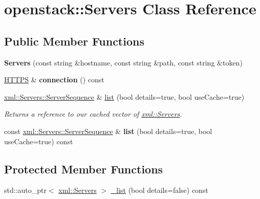 \hypertarget{classopenstack_1_1Servers}{
\section{openstack::Servers Class Reference}
\label{classopenstack_1_1Servers}
}
\subsection*{Public Member Functions}
\begin{DoxyCompactItemize}
\item 
\hypertarget{classopenstack_1_1Servers_aa73baeb7fe19a9fcbb33b9b1c321c0b3}{
{\bfseries Servers} (const string \&hostname, const string \&path, const string \&token)}
\label{classopenstack_1_1Servers_aa73baeb7fe19a9fcbb33b9b1c321c0b3}

\item 
\hypertarget{classopenstack_1_1Servers_ac46388d4916edea6bbe24c6c1189397a}{
\hyperlink{classopenstack_1_1HTTPS}{HTTPS} \& {\bfseries connection} () const }
\label{classopenstack_1_1Servers_ac46388d4916edea6bbe24c6c1189397a}

\item 
\hyperlink{classopenstack_1_1xml_1_1Servers_a9cc28e68df0ebb654db381f4bc6b43e0}{xml::Servers::ServerSequence} \& \hyperlink{classopenstack_1_1Servers_ac7aa9b652744badc3ea60b685404bf6a}{list} (bool details=true, bool useCache=true)
\begin{DoxyCompactList}\small\item\em Returns a reference to our cached vector of \hyperlink{classopenstack_1_1xml_1_1Servers}{xml::Servers}. \item\end{DoxyCompactList}\item 
\hypertarget{classopenstack_1_1Servers_aeb5dba2917cd66a660a633f8e1d43e66}{
const \hyperlink{classopenstack_1_1xml_1_1Servers_a9cc28e68df0ebb654db381f4bc6b43e0}{xml::Servers::ServerSequence} \& {\bfseries list} (bool details=true, bool useCache=true) const }
\label{classopenstack_1_1Servers_aeb5dba2917cd66a660a633f8e1d43e66}

\end{DoxyCompactItemize}
\subsection*{Protected Member Functions}
\begin{DoxyCompactItemize}
\item 
std::auto\_\-ptr$<$ \hyperlink{classopenstack_1_1xml_1_1Servers}{xml::Servers} $>$ \hyperlink{classopenstack_1_1Servers_a26cf89cc479c447e4e9503bd3d7674ab}{\_\-list} (bool details=false) const 
\end{DoxyCompactItemize}
